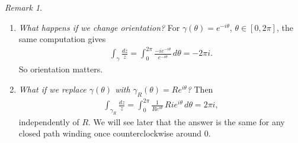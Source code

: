 \documentclass[11pt]{article}
\theoremstyle{plain}
\theoremstyle{definition}
\newtheorem{example}[theorem]{Example}
\theoremstyle{remark}
\newtheorem*{remark}{Remark}
\numberwithin{equation}{section}
\newcommand{\be}{\begin{eqnarray}}
\newcommand{\ee}{\end{eqnarray}}
\begin{document}
\begin{remark}\leavevmode
\begin{enumerate}[label=(\arabic*)]
  \item \emph{What happens if we change orientation?} For
  $\gamma(\theta)=e^{-i\theta}$, $\theta\in[0,2\pi]$, the same computation
  gives
  \be
   \int_\gamma\frac{dz}{z}=\int_0^{2\pi}\frac{-ie^{-i\theta}}{e^{-i\theta}}\,d\theta=-2\pi i.
  \ee
  So orientation matters.
  \item \begin{minipage}[t]{\linewidth}
  \emph{What if we replace $\gamma(\theta)$ with
  $\gamma_R(\theta)=Re^{i\theta}$?} Then
  \be
   \int_{\gamma_R}\frac{dz}z=\int_0^{2\pi}\frac1{Re^{i\theta}}\,Rie^{i\theta}\,d\theta=2\pi i,
  \ee
  independently of $R$. We will see later that the answer is the same for
  any closed path winding once counterclockwise around $0$.
  \begin{center}
  \end{center}
  \end{minipage}
\end{enumerate}
\end{remark}
%
%
\end{document}
